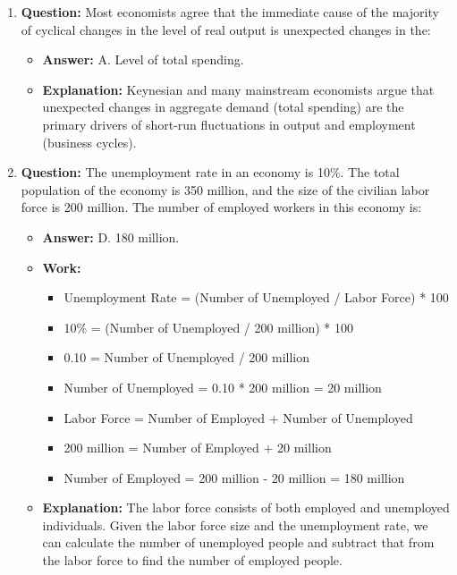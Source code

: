 \documentclass{article}
\begin{document}
\begin{enumerate}[label=\arabic*.]
  \item \textbf{Question:} Most economists agree that the immediate cause of the majority of cyclical changes in the level of real output is unexpected changes in the:
    \begin{itemize}
      \item \textbf{Answer:} A. Level of total spending.
      \item \textbf{Explanation:} Keynesian and many mainstream economists argue that unexpected changes in aggregate demand (total spending) are the primary drivers of short-run fluctuations in output and employment (business cycles).
    \end{itemize}

  \item \textbf{Question:} The unemployment rate in an economy is 10\%. The total population of the economy is 350 million, and the size of the civilian labor force is 200 million. The number of employed workers in this economy is:
    \begin{itemize}
      \item \textbf{Answer:} D. 180 million.
      \item \textbf{Work:}
        \begin{itemize}
          \item Unemployment Rate = (Number of Unemployed / Labor Force) * 100
          \item 10\% = (Number of Unemployed / 200 million) * 100
          \item 0.10 = Number of Unemployed / 200 million
          \item Number of Unemployed = 0.10 * 200 million = 20 million
          \item Labor Force = Number of Employed + Number of Unemployed
          \item 200 million = Number of Employed + 20 million
          \item Number of Employed = 200 million - 20 million = 180 million
        \end{itemize}
      \item \textbf{Explanation:} The labor force consists of both employed and unemployed individuals. Given the labor force size and the unemployment rate, we can calculate the number of unemployed people and subtract that from the labor force to find the number of employed people.
    \end{itemize}


\end{enumerate}
\end{document}
